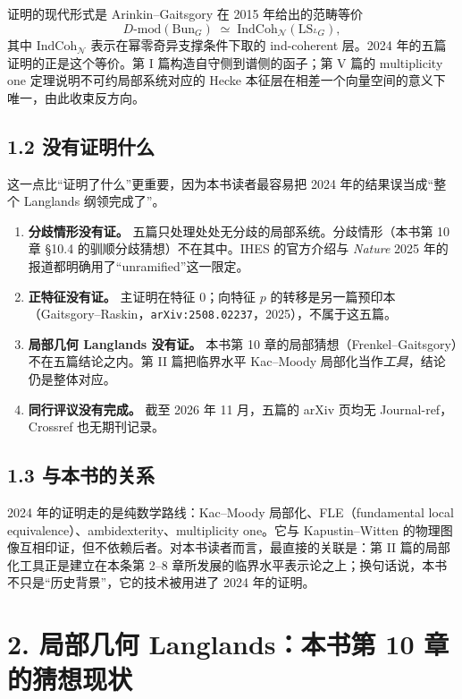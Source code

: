 证明的现代形式是 Arinkin--Gaitsgory 在 2015 年给出的范畴等价
\[
D\text{-}\mathrm{mod}(\mathrm{Bun}_G)\;\simeq\;\mathrm{IndCoh}_{\mathcal N}(\mathrm{LS}_{{}^L G}),
\]
其中 $\mathrm{IndCoh}_{\mathcal N}$ 表示在幂零奇异支撑条件下取的 ind-coherent 层。2024 年的五篇证明的正是这个等价。第 I 篇构造自守侧到谱侧的函子；第 V 篇的 multiplicity one 定理说明不可约局部系统对应的 Hecke 本征层在相差一个向量空间的意义下唯一，由此收束反方向。

\subsection*{1.2 没有证明什么}

这一点比“证明了什么”更重要，因为本书读者最容易把 2024 年的结果误当成“整个 Langlands 纲领完成了”。
\begin{enumerate}
\item \textbf{分歧情形没有证。} 五篇只处理处处无分歧的局部系统。分歧情形（本书第 10 章 §10.4 的驯顺分歧猜想）不在其中。IHES 的官方介绍与 \emph{Nature} 2025 年的报道都明确用了“unramified”这一限定。
\item \textbf{正特征没有证。} 主证明在特征 $0$；向特征 $p$ 的转移是另一篇预印本（Gaitsgory--Raskin，\texttt{arXiv:2508.02237}，2025），不属于这五篇。
\item \textbf{局部几何 Langlands 没有证。} 本书第 10 章的局部猜想（Frenkel--Gaitsgory）不在五篇结论之内。第 II 篇把临界水平 Kac--Moody 局部化当作\emph{工具}，结论仍是整体对应。
\item \textbf{同行评议没有完成。} 截至 2026 年 11 月，五篇的 arXiv 页均无 Journal-ref，Crossref 也无期刊记录。
\end{enumerate}

\subsection*{1.3 与本书的关系}

2024 年的证明走的是纯数学路线：Kac--Moody 局部化、FLE（fundamental local equivalence）、ambidexterity、multiplicity one。它与 Kapustin--Witten 的物理图像互相印证，但不依赖后者。对本书读者而言，最直接的关联是：第 II 篇的局部化工具正是建立在本条第 2--8 章所发展的临界水平表示论之上；换句话说，本书不只是“历史背景”，它的技术被用进了 2024 年的证明。

\section*{2. 局部几何 Langlands：本书第 10 章的猜想现状}

